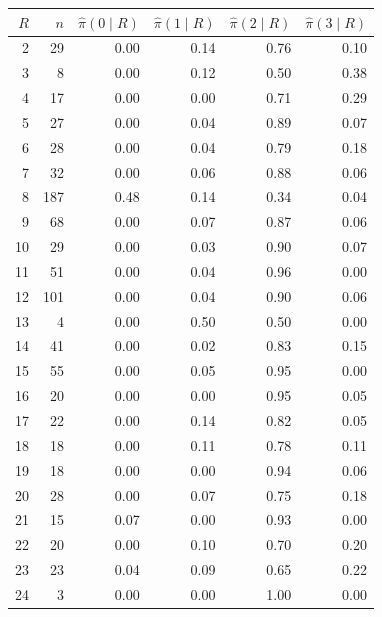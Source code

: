 \begin{tabular}{rrrrrr}
\toprule
$R$ & $n$ & $\hat\pi(0\mid R)$ & $\hat\pi(1\mid R)$ & $\hat\pi(2\mid R)$ & $\hat\pi(3\mid R)$ \\
\midrule
2 & 29 & 0.00 & 0.14 & 0.76 & 0.10 \\
3 & 8 & 0.00 & 0.12 & 0.50 & 0.38 \\
4 & 17 & 0.00 & 0.00 & 0.71 & 0.29 \\
5 & 27 & 0.00 & 0.04 & 0.89 & 0.07 \\
6 & 28 & 0.00 & 0.04 & 0.79 & 0.18 \\
7 & 32 & 0.00 & 0.06 & 0.88 & 0.06 \\
8 & 187 & 0.48 & 0.14 & 0.34 & 0.04 \\
9 & 68 & 0.00 & 0.07 & 0.87 & 0.06 \\
10 & 29 & 0.00 & 0.03 & 0.90 & 0.07 \\
11 & 51 & 0.00 & 0.04 & 0.96 & 0.00 \\
12 & 101 & 0.00 & 0.04 & 0.90 & 0.06 \\
13 & 4 & 0.00 & 0.50 & 0.50 & 0.00 \\
14 & 41 & 0.00 & 0.02 & 0.83 & 0.15 \\
15 & 55 & 0.00 & 0.05 & 0.95 & 0.00 \\
16 & 20 & 0.00 & 0.00 & 0.95 & 0.05 \\
17 & 22 & 0.00 & 0.14 & 0.82 & 0.05 \\
18 & 18 & 0.00 & 0.11 & 0.78 & 0.11 \\
19 & 18 & 0.00 & 0.00 & 0.94 & 0.06 \\
20 & 28 & 0.00 & 0.07 & 0.75 & 0.18 \\
21 & 15 & 0.07 & 0.00 & 0.93 & 0.00 \\
22 & 20 & 0.00 & 0.10 & 0.70 & 0.20 \\
23 & 23 & 0.04 & 0.09 & 0.65 & 0.22 \\
24 & 3 & 0.00 & 0.00 & 1.00 & 0.00 \\
\bottomrule
\end{tabular}
